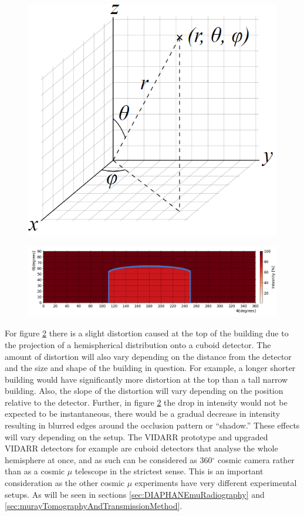  \begin{figure}[!h]
 \centering
 \includegraphics[width=0.3\linewidth]{Chapter5/Figs/wylfaRasterNew/sphericalPolarCoordinatesystem.png}
 \label{fig:sphericalPolarCoordinateSystem}
\end{figure}

 \begin{figure}[!h]
 \centering
 \includegraphics[width=\linewidth]{Chapter5/Figs/wylfaRasterNew/thetaVsPhiExpectedCube.png}
 \label{fig:thetaVsPhiExpectedCube}
\end{figure}

For figure \ref{fig:thetaVsPhiExpectedCube} there is a slight distortion caused at the top of the building due to the projection of a hemispherical distribution onto a cuboid detector. The amount of distortion will also vary depending on the distance from the detector and the size and shape of the building in question. For example, a longer shorter building would have significantly more distortion at the top than a tall narrow building. Also, the slope of the distortion will vary depending on the position relative to the detector. Further, in figure \ref{fig:thetaVsPhiExpectedCube} the drop in intensity would not be expected to be instantaneous, there would be a gradual decrease in intensity resulting in blurred edges around the occlusion pattern or ``shadow.'' These effects will vary depending on the setup. The VIDARR prototype and upgraded VIDARR detectors for example are cuboid detectors that analyse the whole hemisphere at once, and as such can be considered as 360$^\circ$ cosmic camera rather than as a cosmic $\mu$ telescope in the strictest sense. This is an important consideration as the other cosmic $\mu$ experiments have very different experimental setups. As will be seen in sections \ref{sec:DIAPHANEmuRadiography} and \ref{sec:murayTomographyAndTransmissionMethod}.

